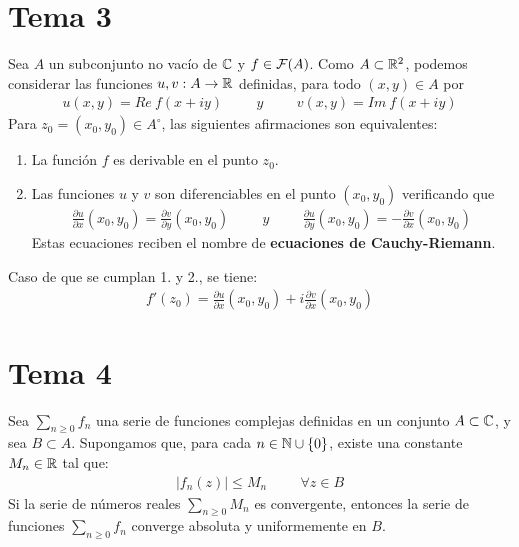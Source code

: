 \documentclass[12pt]{article}
\begin{document}
    \section{Tema 3}

    \begin{teo}
        Sea $A$ un subconjunto no vacío de $\mathbb{C}$ y $f\in \mathcal{F}(A)$. Como $A\subset \mathbb{R}^2$, podemos considerar las funciones $u,v:A \to \mathbb{R}$ definidas, para todo $(x,y)\in A$ por
        \begin{gather*}
            u(x,y) = Re\ f(x+iy) \hspace{1cm} y \hspace{1cm} v(x,y) = Im\ f(x+iy)
        \end{gather*}
        Para $z_0=(x_0,y_0)\in A^\circ$, las siguientes afirmaciones son equivalentes:
        \begin{enumerate}
            \item La función $f$ es derivable en el punto $z_0$.
            \item Las funciones $u$ y $v$ son diferenciables en el punto $(x_0, y_0)$ verificando que 
            \begin{gather*}
                \frac{\partial u}{\partial x} (x_0, y_0) = \frac{\partial v}{\partial y} (x_0, y_0) \hspace{1cm} y \hspace{1cm} \frac{\partial u}{\partial y} (x_0, y_0) = -\frac{\partial v}{\partial x} (x_0, y_0)
            \end{gather*}
            Estas ecuaciones reciben el nombre de \textbf{ecuaciones de Cauchy-Riemann}.
        \end{enumerate}
        Caso de que se cumplan 1. y 2., se tiene:
        \begin{gather*}
            f'(z_0) = \frac{\partial u}{\partial x} (x_0, y_0) + i \frac{\partial v}{\partial x} (x_0, y_0)
        \end{gather*}
    \end{teo}

    \section{Tema 4}

    \begin{teo}
        Sea $\sum\limits_{n\geq 0} f_n$ una serie de funciones complejas definidas en un conjunto $A\subset \mathbb{C}$, y sea $B\subset A$. Supongamos que, para cada $n\in \mathbb{N}\cup \{0\}$, existe una constante $M_n\in \mathbb{R}$ tal que:
        \begin{gather*}
            |f_n(z)| \leq M_n \hspace{1cm} \forall z \in B
        \end{gather*}
        Si la serie de números reales $\sum\limits_{n\geq 0} M_n$ es convergente, entonces la serie de funciones $\sum\limits_{n\geq 0} f_n$ converge absoluta y uniformemente en $B$.
    \end{teo}
\end{document}

